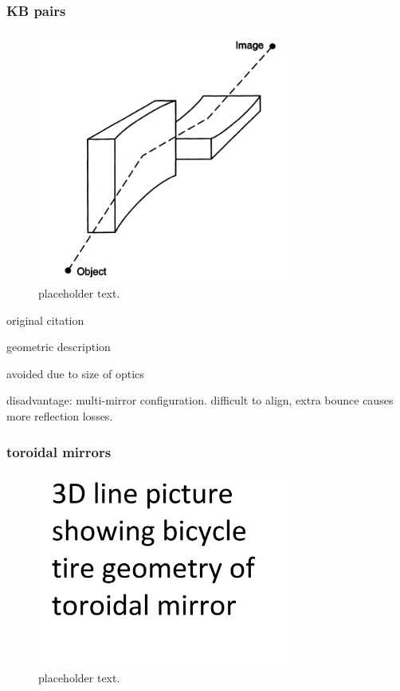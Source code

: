 \subsubsection{KB pairs}
\begin{figure}
	\centering
	\includegraphics[width=0.75\textwidth]{figures/chap2/KB_geometry_Howells1994.png}
	\caption{placeholder text.}
	\label{fig:KB_geometry_Howells1994}
\end{figure}

original citation \cite{kirkpatrickFormationOpticalImages1948}

geometric description

avoided due to size of optics

disadvantage: multi-mirror configuration. difficult to align, extra bounce causes more reflection losses.

\subsubsection{toroidal mirrors}
\begin{figure}
	\centering
	\includegraphics[width=0.75\textwidth]{figures/chap2/TM_geometry.png}
	\caption{placeholder text.}
	\label{fig:TM_geometry}
\end{figure}


